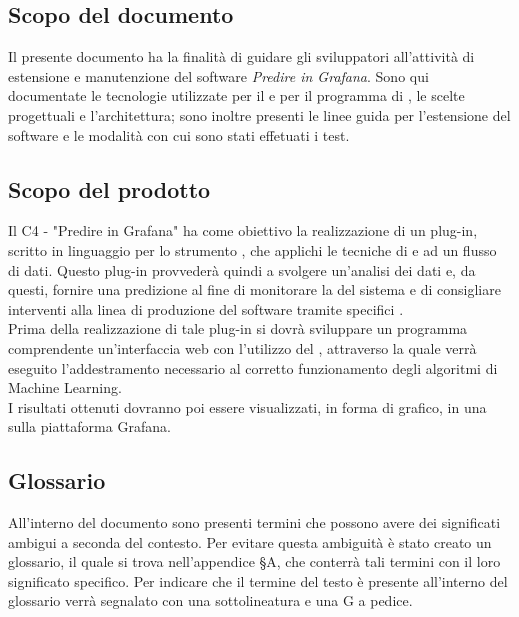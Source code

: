 \documentclass[../manuale-sviluppatore.tex]{subfiles}
\begin{document}
\subsection{Scopo del documento}%
\label{subs:scopo_del_documento}
Il presente documento ha la finalità di guidare gli sviluppatori all'attività di estensione e manutenzione del software \emph{Predire in Grafana}. Sono qui documentate le tecnologie utilizzate per il  e per il programma di , le scelte progettuali e l'architettura; sono inoltre presenti le linee guida per l'estensione del software e le modalità con cui sono stati effetuati i test.

\subsection{Scopo del prodotto}%
\label{subs:scopo_del_prodotto}
Il  C4 - "Predire in Grafana" ha come obiettivo la realizzazione di un plug-in, scritto in linguaggio  per lo strumento  , che applichi le tecniche di   e  ad un flusso di dati. Questo plug-in provvederà quindi a svolgere un'analisi dei dati e, da questi, fornire una predizione al fine di monitorare la  del sistema e di consigliare interventi alla linea di produzione del software tramite specifici . \\
Prima della realizzazione di tale plug-in si dovrà sviluppare un programma comprendente un'interfaccia web con l'utilizzo del  , attraverso la quale verrà eseguito l'addestramento necessario al corretto funzionamento degli algoritmi di Machine Learning. \\
I risultati ottenuti dovranno poi essere visualizzati, in forma di grafico, in una  sulla piattaforma Grafana.

\subsection{Glossario}
\label{subs:glossario}
All'interno del documento sono presenti termini che possono avere dei significati ambigui a seconda del contesto. Per evitare questa ambiguità è stato creato un glossario, il quale si trova nell'appendice §A, che conterrà tali termini con il loro significato specifico. Per indicare che il termine del testo è presente all'interno del glossario verrà segnalato con una sottolineatura e una G a pedice.
\end{document}

